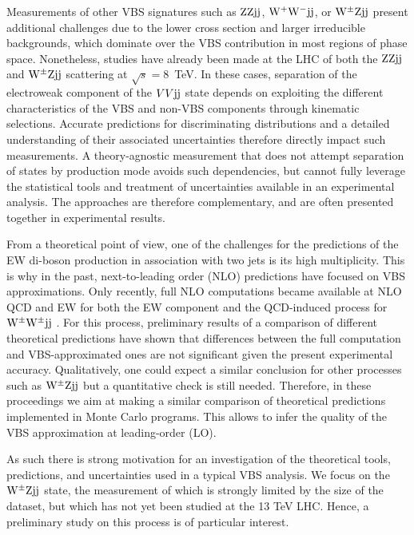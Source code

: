 \documentclass[11pt]{cernrep}
\begin{document}
Measurements of other VBS signatures such as ${\rm Z}{\rm Z}{\rm j}{\rm j}$, ${\rm W}^+{\rm W}^-{\rm j}{\rm j}$, or ${\rm W}^{\pm}{\rm Z}{\rm j}{\rm j}$ present additional challenges due to the lower cross section and larger irreducible backgrounds, which dominate over the VBS contribution in most regions of phase space.
Nonetheless, studies have already been made at the LHC of both the ${\rm Z}{\rm Z}{\rm j}{\rm j}$ \cite{Sirunyan:2017fvv} and ${\rm W}^{\pm}{\rm Z}{\rm j}{\rm j}$ \cite{Aad:2016ett} scattering at $\sqrt{s} = 8$~TeV.
In these cases, separation of the electroweak component of the $VV{\rm j}{\rm j}$ state depends on exploiting the different characteristics of the VBS and non-VBS
components through kinematic selections.
Accurate predictions for discriminating distributions and a detailed understanding of their associated uncertainties therefore directly impact such measurements.
A theory-agnostic measurement that does not attempt separation of states by production mode avoids such dependencies,
but cannot fully leverage the statistical tools and treatment of uncertainties available in an experimental analysis.
The approaches are therefore complementary, and are often presented together in experimental results.

From a theoretical point of view, one of the challenges for the predictions of the EW di-boson production in association with two jets is its high multiplicity.
This is why in the past, next-to-leading order (NLO) predictions have focused on VBS approximations.
Only recently, full NLO computations became available at NLO QCD and EW for both the EW component and the QCD-induced process for ${\rm W}^\pm{\rm W}^\pm{\rm j}{\rm j}$ \cite{Biedermann:2017bss}.
For this process, preliminary results \cite{Anders:2018gfr} of a comparison of different theoretical predictions have shown that differences between the full computation and VBS-approximated ones are not significant given the present experimental accuracy.
Qualitatively, one could expect a similar conclusion for other processes such as ${\rm W}^{\pm}{\rm Z}{\rm j}{\rm j}$ but a quantitative check is still needed.
Therefore, in these proceedings we aim at making a similar comparison of theoretical predictions implemented in Monte Carlo programs.
This allows to infer the quality of the VBS approximation at leading-order (LO).

As such there is strong motivation for an investigation of the theoretical tools, predictions, and uncertainties
used in a typical VBS analysis. 
We focus on the ${\rm W}^{\pm}{\rm Z}{\rm j}{\rm j}$ \cite{Aad:2016ett} state, the measurement of which is strongly limited by the size of the dataset, 
but which has not yet been studied at the 13 TeV LHC. Hence, a preliminary study on this process is of particular interest.
\end{document}
